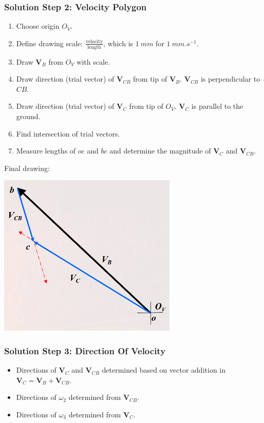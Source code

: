 \documentclass[11pt]{article}
\begin{document}
\subsubsection{Solution Step 2: Velocity Polygon}
\label{sec:org2922e62}
\begin{enumerate}
\item Choose origin \(O_V\).
\item Define drawing scale: \(\frac{\text{velocity}}{\text{length}}\), which is \(\qty{1}{mm}\) for \(\qty{1}{mm.s^{-1}}\).
\item Draw \(\boldsymbol{V}_B\) from \(O_V\) with scale.
\item Draw direction (trial vector) of \(\boldsymbol{V}_{CB}\) from tip of \(\boldsymbol{V}_B\). \(\boldsymbol{V}_{CB}\) is perpendicular to \(CB\).
\item Draw direction (trial vector) of \(\boldsymbol{V}_C\) from tip of \(O_V\). \(\boldsymbol{V}_C\) is parallel to the ground.
\item Find intersection of trial vectors.
\item Measure lengths of \(oc\) and \(bc\) and determine the magnitude of \(\boldsymbol{V}_C\) and \(\boldsymbol{V}_{CB}\).
\end{enumerate}

Final drawing:
\begin{center}
\includegraphics[width=.9\linewidth]{./images/4-bar-linkage-graphical-analysis-example-velocity-polygon.png}
\end{center}
\subsubsection{Solution Step 3: Direction Of Velocity}
\label{sec:orgb86acb4}
\begin{itemize}
\item Directions of \(\boldsymbol{V}_C\) and \(\boldsymbol{V}_{CB}\) determined based on vector addition in \(\boldsymbol{V}_C = \boldsymbol{V}_B + \boldsymbol{V}_{CB}\).
\item Directions of \(\omega_2\) determined from \(\boldsymbol{V}_{CB}\).
\item Directions of \(\omega_3\) determined from \(\boldsymbol{V}_{C}\).
\end{itemize}
\end{document}
